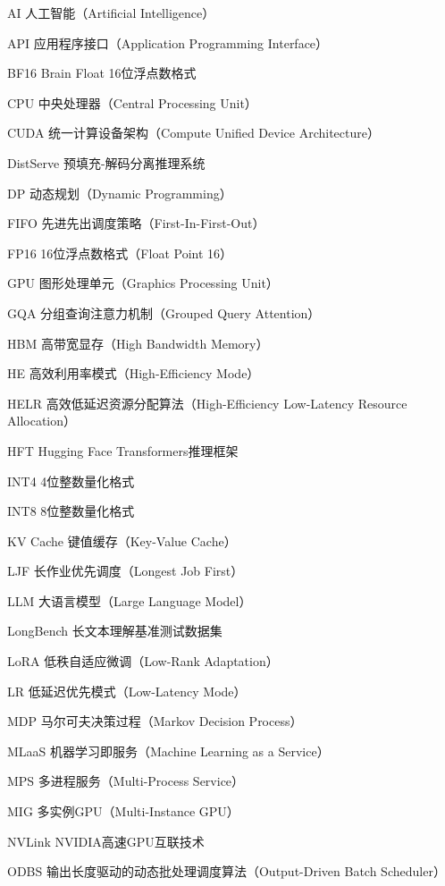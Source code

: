 \begin{denotation}[3cm]
  \item[AI]人工智能（Artificial Intelligence）
  \item[API]应用程序接口（Application Programming Interface）
  \item[BF16]Brain Float 16位浮点数格式
  \item[CPU]中央处理器（Central Processing Unit）
  \item[CUDA]统一计算设备架构（Compute Unified Device Architecture）
  \item[DistServe]预填充-解码分离推理系统\cite{zhong2024distserve}
  \item[DP]动态规划（Dynamic Programming）
  \item[FIFO]先进先出调度策略（First-In-First-Out）
  \item[FP16]16位浮点数格式（Float Point 16）
  \item[GPU]图形处理单元（Graphics Processing Unit）
  \item[GQA]分组查询注意力机制（Grouped Query Attention）
  \item[HBM]高带宽显存（High Bandwidth Memory）
  \item[HE]高效利用率模式（High-Efficiency Mode）
  \item[HELR]高效低延迟资源分配算法（High-Efficiency Low-Latency Resource Allocation）
  \item[HFT]Hugging Face Transformers推理框架
  \item[INT4]4位整数量化格式
  \item[INT8]8位整数量化格式
  \item[KV Cache]键值缓存（Key-Value Cache）
  \item[LJF]长作业优先调度（Longest Job First）
  \item[LLM]大语言模型（Large Language Model）
  \item[LongBench]长文本理解基准测试数据集\cite{bai2023longbench}
  \item[LoRA]低秩自适应微调（Low-Rank Adaptation）
  \item[LR]低延迟优先模式（Low-Latency Mode）
  \item[MDP]马尔可夫决策过程（Markov Decision Process）
  \item[MLaaS]机器学习即服务（Machine Learning as a Service）
  \item[MPS]多进程服务（Multi-Process Service）
  \item[MIG]多实例GPU（Multi-Instance GPU）
  \item[NVLink]NVIDIA高速GPU互联技术
  \item[ODBS]输出长度驱动的动态批处理调度算法（Output-Driven Batch Scheduler）

\end{denotation}
